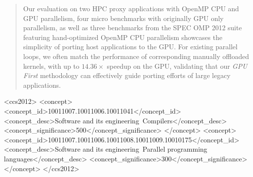 \documentclass[sigconf,screen]{acmart}
\begin{document}
\begin{abstract}
Our evaluation on two HPC proxy applications with OpenMP CPU and GPU parallelism, four micro benchmarks with originally GPU only parallelism, as well as three benchmarks from the SPEC OMP 2012 suite featuring hand-optimized OpenMP CPU parallelism showcases the simplicity of porting host applications to the GPU.
For existing parallel loops, we often match the performance of corresponding manually offloaded kernels, with up to $14.36\times$ speedup on the GPU, validating that our \emph{GPU First} methodology can effectively guide porting efforts of large legacy applications.

\end{abstract}

\begin{CCSXML}
<ccs2012>
   <concept>
       <concept_id>10011007.10011006.10011041</concept_id>
       <concept_desc>Software and its engineering~Compilers</concept_desc>
       <concept_significance>500</concept_significance>
       </concept>
   <concept>
       <concept_id>10011007.10011006.10011008.10011009.10010175</concept_id>
       <concept_desc>Software and its engineering~Parallel programming languages</concept_desc>
       <concept_significance>300</concept_significance>
       </concept>
 </ccs2012>
\end{CCSXML}




\end{document}
